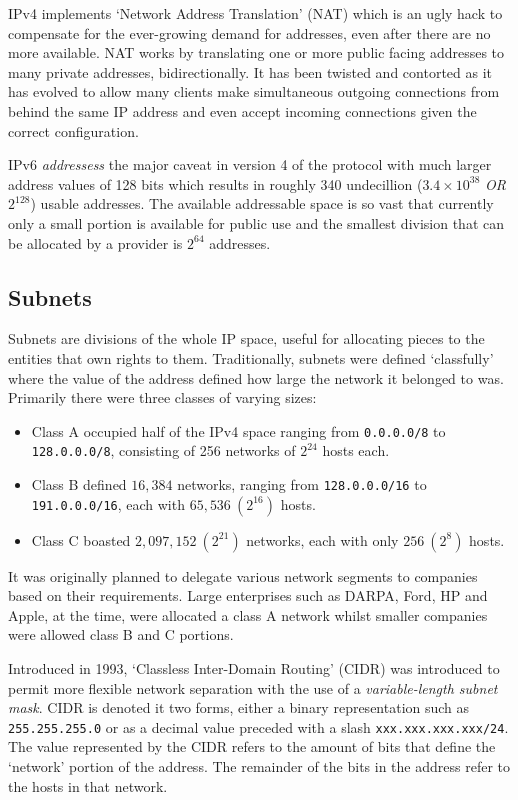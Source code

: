     IPv4 implements `Network Address Translation' (NAT) which is an ugly hack to compensate for the ever-growing demand for addresses, even after there are no more available. NAT works by translating one or more public facing addresses to many private addresses, bidirectionally. It has been twisted and contorted as it has evolved to allow many clients make simultaneous outgoing connections from behind the same IP address and even accept incoming connections given the correct configuration.

    IPv6 \textit{addressess} the major caveat in version 4 of the protocol with much larger address values of 128 bits which results in roughly 340 undecillion ($3.4 \times 10^{38}$ \textit{OR} $2^{128}$) usable addresses. The available addressable space is so vast that currently only a small portion is available for public use and the smallest division that can be allocated by a provider is $2^{64}$ addresses.

    \subsection{Subnets}
    Subnets are divisions of the whole IP space, useful for allocating pieces to the entities that own rights to them. Traditionally, subnets were defined `classfully' where the value of the address defined how large the network it belonged to was. Primarily there were three classes of varying sizes:
    \begin{itemize}
        \item{Class A occupied half of the IPv4 space ranging from \texttt{0.0.0.0/8} to \texttt{128.0.0.0/8}, consisting of 256 networks of $2^{24}$ hosts each.}
        \item{Class B defined $16,384$ networks, ranging from \texttt{128.0.0.0/16} to \texttt{191.0.0.0/16}, each with $65,536\ (2^{16})$ hosts.}
        \item{Class C boasted $2,097,152\ (2^{21})$ networks, each with only $256\ (2^{8})$ hosts.}
    \end{itemize}

    It was originally planned to delegate various network segments to companies based on their requirements. Large enterprises such as DARPA, Ford, HP and Apple, at the time, were allocated a class A network whilst smaller companies were allowed class B and C portions.

    Introduced in 1993, `Classless Inter-Domain Routing' (CIDR) was introduced to permit more flexible network separation with the use of a \textit{variable-length subnet mask}. CIDR is denoted it two forms, either a binary representation such as \texttt{255.255.255.0} or as a decimal value preceded with a slash \texttt{xxx.xxx.xxx.xxx/24}. The value represented by the CIDR refers to the amount of bits that define the `network' portion of the address. The remainder of the bits in the address refer to the hosts in that network.

